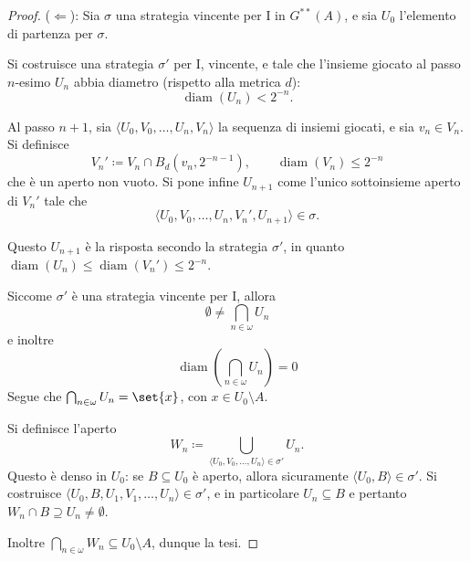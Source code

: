 \documentclass[titlepage]{article}
\newcommand{\1}{\mathds{1}}
\theoremstyle{definition}%
\theoremstyle{plain}
\theoremstyle{remark}
\begin{document}
\begin{proof}
(\(\Leftarrow\)): Sia \(\sigma\) una strategia vincente per I in \(G^{**}(A)\), e sia \(U_{0}\) l'elemento di partenza per \(\sigma\).

Si costruisce una strategia \(\sigma'\) per I, vincente, e tale che l'insieme giocato al passo \(n\)-esimo \(U_{n}\) abbia diametro (rispetto alla metrica \(d\)):
\begin{equation*}
\operatorname{diam}(U_{n})<2^{-n}.
\end{equation*}

Al passo \(n+1\), sia \(\langle U_{0},V_{0},\dots,U_{n}, V_{n}\rangle\) la sequenza di insiemi giocati, e sia \(v_{n} \in V_{n}\). Si definisce
\begin{equation*}
V_{n}'\coloneqq V_{n}\cap B_{d}(v_{n}, 2^{-n-1}), \qquad \operatorname{diam}(V_{n}) \le 2^{-n}
\end{equation*}
che è un aperto non vuoto. Si pone infine \(U_{n+1}\) come l'unico sottoinsieme aperto di \(V_{n}'\) tale che
\begin{equation*}
\langle U_{0},V_{0},\dots,U_{n}, V_{n}', U_{n+1}\rangle \in \sigma.
\end{equation*}

Questo \(U_{n+1}\) è la risposta secondo la strategia \(\sigma'\), in quanto \(\operatorname{diam}(U_{n})\le \operatorname{diam}(V_{n}')\le 2^{-n}\).

Siccome \(\sigma'\) è una strategia vincente per I, allora
\begin{equation*}
\emptyset\neq\bigcap_{n \in \omega} U_{n}
\end{equation*}
e inoltre
\begin{equation*}
\operatorname{diam}\left(\bigcap_{n \in \omega} U_{n}\right) = 0
\end{equation*}
Segue che \(\bigcap_{n \in \omega} U_{n} = \set{x}\), con \(x \in U_{0}\setminus A\).

Si definisce l'aperto
\begin{equation*}
W_{n} \coloneqq \bigcup_{\langle U_{0},V_{0},\dots,U_{n}\rangle \in \sigma'} U_{n}.
\end{equation*}
Questo è denso in \(U_{0}\): se \(B \subseteq U_{0}\) è aperto, allora sicuramente \(\langle U_{0},B\rangle \in \sigma'\). Si costruisce \(\langle U_{0},B,U_{1},V_{1},\dots,U_{n}\rangle \in \sigma'\), e in particolare \(U_{n} \subseteq B\) e pertanto \(W_{n}\cap B\supseteq U_{n}\neq\emptyset\).

Inoltre \(\bigcap_{n \in \omega} W_{n} \subseteq U_{0}\setminus A\), dunque la tesi.
\end{proof}
\end{document}
